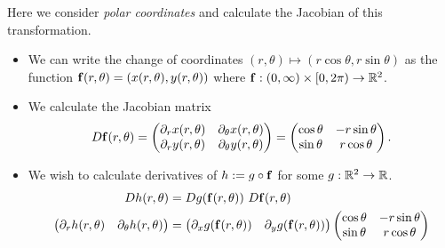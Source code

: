 \begin{example}
    Here we consider \emph{polar coordinates} and calculate the Jacobian of this transformation.
    \begin{itemize}
        \item
              We can write the change of coordinates
              \((r,\theta) \mapsto (r\cos \theta, r\sin \theta)\)
              as the function  \(\mathbf{f}(r,\theta) = (x(r,\theta),y(r,\theta))\) where \(\mathbf{f}:(0,\infty)\times [0,2\pi) \to \mathbb{R}^2\).
        \item
              We calculate the Jacobian matrix
              \[
                  D\mathbf{f}(r,\theta) =
                  \begin{pmatrix}
                      \partial_{r}x(r,\theta) & \partial_{\theta}x(r,\theta) \\
                      \partial_{r}y(r,\theta) & \partial_{\theta}y(r,\theta)
                  \end{pmatrix}
                  =
                  \begin{pmatrix}
                      \cos \theta & -r\sin \theta \\
                      \sin \theta & r\cos \theta
                  \end{pmatrix}.
              \]
        \item
              We wish to calculate derivatives of \(h := g \circ \mathbf{f}\) for some  \(g:\mathbb{R}^2 \to \mathbb{R}\).
              \[
                  \begin{aligned}
                      Dh(r,\theta) & = Dg(\ff(r,\theta)) \ D\ff(r,\theta) \\
                      \begin{pmatrix}
                          \partial_r h(r,\theta) & \partial_\theta h(r,\theta)
                      \end{pmatrix}
                                   & =
                      \begin{pmatrix}
                          \partial_x g(\ff(r,\theta)) & \partial_y g(\ff(r,\theta))
                      \end{pmatrix}
                      \begin{pmatrix}
                          \cos \theta & -r\sin \theta \\
                          \sin \theta & r\cos \theta
                      \end{pmatrix}
                  \end{aligned}
              \]


\end{itemize}
\end{example}
